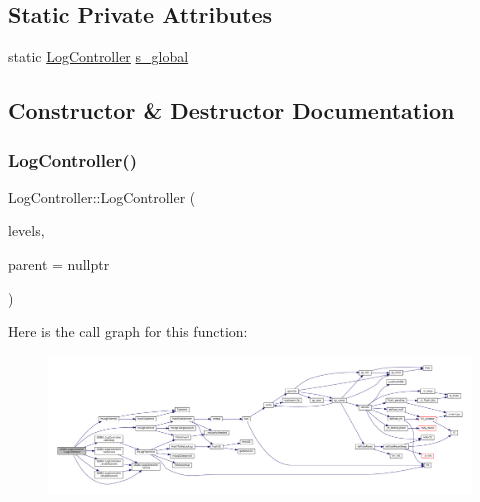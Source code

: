 \subsection*{Static Private Attributes}
\begin{DoxyCompactItemize}
\item 
static \mbox{\hyperlink{class_q_g_b_a_1_1_log_controller}{Log\+Controller}} \mbox{\hyperlink{class_q_g_b_a_1_1_log_controller_ab76d2c8bb8da22bd080aa178aac809a6}{s\+\_\+global}}
\end{DoxyCompactItemize}


\subsection{Constructor \& Destructor Documentation}
\mbox{\label{class_q_g_b_a_1_1_log_controller_a30bfc4a1ee38bd0aa8af348c9d187b14}} 
\subsubsection{\texorpdfstring{Log\+Controller()}{LogController()}}
{\footnotesize\ttfamily Log\+Controller\+::\+Log\+Controller (\begin{DoxyParamCaption}\item[{\mbox{\hyperlink{ioapi_8h_a787fa3cf048117ba7123753c1e74fcd6}{int}}}]{levels,  }\item[{Q\+Object $\ast$}]{parent = {\ttfamily nullptr} }\end{DoxyParamCaption})}

Here is the call graph for this function\+:
\nopagebreak
\begin{figure}[H]
\begin{center}
\leavevmode
\includegraphics[width=350pt]{class_q_g_b_a_1_1_log_controller_a30bfc4a1ee38bd0aa8af348c9d187b14_cgraph}
\end{center}
\end{figure}



